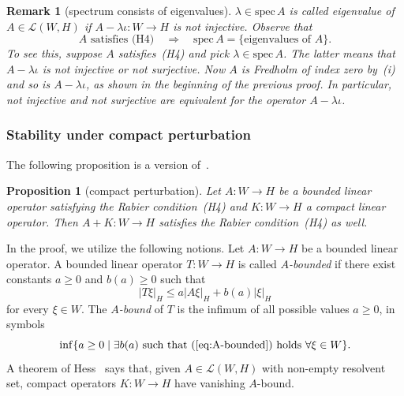 \documentclass[pdftex]{sigma}
\numberwithin{equation}{section}
\newtheorem{Proposition}[Theorem]{Proposition}
\newtheorem{Remark}[Theorem]{Remark}
\newcommand{\Ll}{{\mathcal{L}}} %
\newcommand{\spec}{\mathrm{spec}\,} %
\def\abs#1{\mathopen|#1\mathclose|}
\newcommand{\1}{{{\mathchoice {\rm 1\mskip-4mu l} {\rm 1\mskip-4mu l}
{\rm 1\mskip-4.5mu l} {\rm 1\mskip-5mu l}}}}
\begin{document}
\begin{Remark}[spectrum consists of eigenvalues]
$\lambda\in\spec A$ is called
\textit{eigenvalue} of $A\in\Ll(W,H)$
if $A-\lambda\iota\colon W\to H$ is not injective.
Observe that
\begin{equation*}%
 \text{$A$ satisfies (H4)}\quad\Rightarrow\quad
 \spec A=\{\text{eigenvalues of $A$}\}.
\end{equation*}
To see this, suppose $A$ satisfies~(H4) and pick $\lambda\in \spec A$.
The latter means that $A-\lambda\iota$ is not injective or not surjective.
Now $A$ is Fredholm of index zero by~(i) and so is $A-\lambda\iota$,
as shown in the beginning of the previous proof.
In particular, not injective and not surjective are equivalent for
the operator $A-\lambda\iota$.
\end{Remark}

\subsubsection*{Stability under compact perturbation}

The following proposition is a version of~\cite[Theorem~3.5]{Rabier:2003a}.

\begin{Proposition}[compact perturbation]\label{prop:Rabier+compact}
Let $A\colon W\to H$ be a bounded linear operator
satisfying the Rabier condition~{\rm (H4)}
and $K\colon W\to H$ a compact linear operator.
Then $A+K\colon W\to H$
satisfies the Rabier condition~{\rm (H4)} as well.
\end{Proposition}

In the proof, we utilize the following notions.
Let $A\colon W\to H$ be a bounded linear operator.
A bounded linear operator $T\colon W\to H$ is called
\textit{\boldmath$A$-bounded} if
there exist constants $a\ge 0$ and $b(a)\ge 0$ such that
\begin{equation}\label{eq:A-bounded}
 \abs{T\xi}_H\le a\abs{A\xi}_H+b(a)\abs{\xi}_H
\end{equation}
for every $\xi\in W$.
The \textit{\boldmath$A$-bound} of $T$
is the infimum of all possible values $a\ge 0$, in symbols
\[
 \inf\{a\ge 0\mid\text{$\exists b(a)$ such that~(\ref{eq:A-bounded})
 holds $\forall \xi\in W$}\}.
\]
A theorem of Hess~\cite[Satz~1]{Hess:1969a}
says that, given $A\in\Ll(W,H)$ with non-empty resolvent set,
compact operators $K\colon W\to H$ have vanishing $A$-bound.
\end{document}
